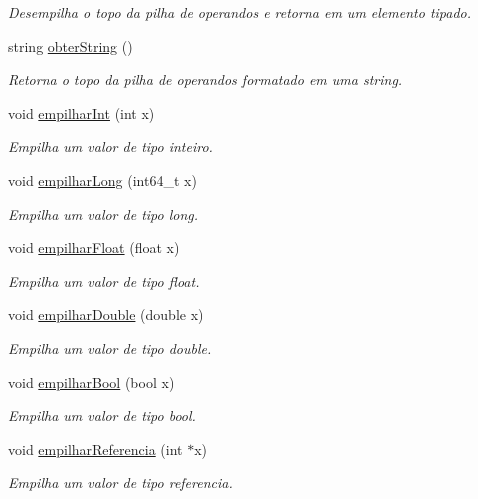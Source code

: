 \begin{DoxyCompactItemize}
\begin{DoxyCompactList}\small\item\em Desempilha o topo da pilha de operandos e retorna em um elemento tipado. \end{DoxyCompactList}\item 
string \hyperlink{classOperandsStack_a32ad6a1ea26c02cf709fed1e86412b4a}{obter\+String} ()
\begin{DoxyCompactList}\small\item\em Retorna o topo da pilha de operandos formatado em uma string. \end{DoxyCompactList}\item 
void \hyperlink{classOperandsStack_a5006a59c2d815e4a24b055e2e4d2e741}{empilhar\+Int} (int x)
\begin{DoxyCompactList}\small\item\em Empilha um valor de tipo inteiro. \end{DoxyCompactList}\item 
void \hyperlink{classOperandsStack_a927ca84358d7e0f45f74d122f9a500d2}{empilhar\+Long} (int64\+\_\+t x)
\begin{DoxyCompactList}\small\item\em Empilha um valor de tipo long. \end{DoxyCompactList}\item 
void \hyperlink{classOperandsStack_aeed478b52748b87ac85db261332b633b}{empilhar\+Float} (float x)
\begin{DoxyCompactList}\small\item\em Empilha um valor de tipo float. \end{DoxyCompactList}\item 
void \hyperlink{classOperandsStack_a45dde91cc54ad980d1cbb7cdb1e084cd}{empilhar\+Double} (double x)
\begin{DoxyCompactList}\small\item\em Empilha um valor de tipo double. \end{DoxyCompactList}\item 
void \hyperlink{classOperandsStack_aca2be3100b76689949f029196a893712}{empilhar\+Bool} (bool x)
\begin{DoxyCompactList}\small\item\em Empilha um valor de tipo bool. \end{DoxyCompactList}\item 
void \hyperlink{classOperandsStack_a47af7d965172984b9cc5c61d8c4c1ce3}{empilhar\+Referencia} (int $\ast$x)
\begin{DoxyCompactList}\small\item\em Empilha um valor de tipo referencia. \end{DoxyCompactList}\item 

\end{DoxyCompactItemize}

